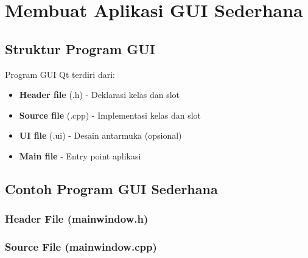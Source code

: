 

\section{Membuat Aplikasi GUI Sederhana}

\subsection{Struktur Program GUI}

Program GUI Qt terdiri dari:
\begin{itemize}
\item \textbf{Header file} (.h) - Deklarasi kelas dan slot
\item \textbf{Source file} (.cpp) - Implementasi kelas dan slot
\item \textbf{UI file} (.ui) - Desain antarmuka (opsional)
\item \textbf{Main file} - Entry point aplikasi
\end{itemize}

\subsection{Contoh Program GUI Sederhana}

\subsubsection{Header File (mainwindow.h)}



\subsubsection{Source File (mainwindow.cpp)}

